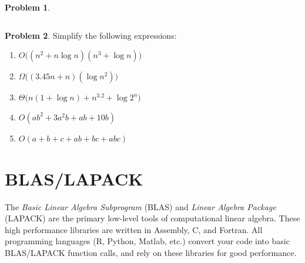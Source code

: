 \documentclass[10pt]{article}
\theoremstyle{definition}
\newtheorem{problem}{Problem}
\begin{document}
\begin{problem}
{\begin{tabular}{c c c c c c}
\end{tabular}
}
\end{problem}

\newpage
\begin{problem}
    Simplify the following expressions:

\begin{enumerate}
    \item $O\bigg((n^2 + n\log n)(n^3 + \log n)\bigg)$
    \vspace{1.5in}
\item $\Omega\bigg((3.45n + n)(\log n^2)\bigg)$
    \vspace{1.5in}
\item $\Theta\bigg(n(1 + \log n) + n^{3.2} + \log 2^n\bigg)$
    \vspace{1.5in}
\item $O(ab^2 + 3a^2b + ab + 10b)$
    \vspace{1.5in}
\item $O(a + b + c + ab + bc + abc)$
    \vspace{1.5in}
\end{enumerate}
\end{problem}


\newpage
\section{BLAS/LAPACK}

The \emph{Basic Linear Algebra Subprogram} (BLAS) and \emph{Linear Algebra Package} (LAPACK) are the primary low-level tools of computational linear algebra.
These high performance libraries are written in Assembly, C, and Fortran.
All programming languages (R, Python, Matlab, etc.) convert your code into basic BLAS/LAPACK function calls,
and rely on these libraries for good performance.
\end{document}
